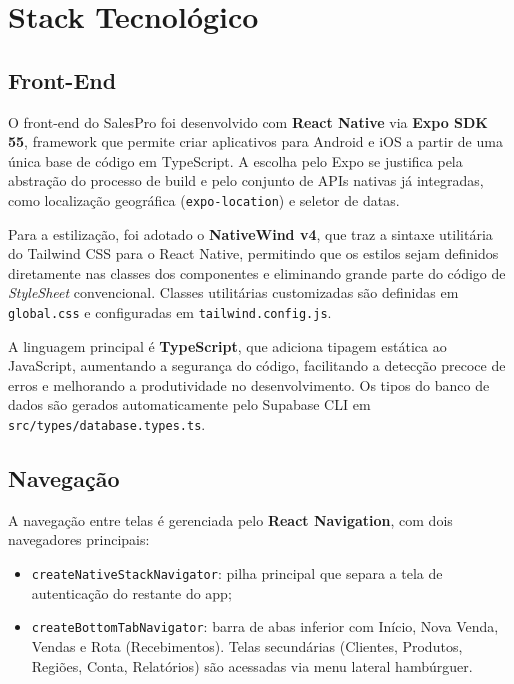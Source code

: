 \documentclass[
	12pt,				%
	oneside,			%
	a4paper,			%
	english,			%
	brazil				%
	]{abntex2}
\begin{document}
\chapter{Stack Tecnológico}

\section{Front-End}

O front-end do SalesPro foi desenvolvido com \textbf{React Native} via \textbf{Expo SDK 55}, framework que permite criar aplicativos para Android e iOS a partir de uma única base de código em TypeScript. A escolha pelo Expo se justifica pela abstração do processo de build e pelo conjunto de APIs nativas já integradas, como localização geográfica (\texttt{expo-location}) e seletor de datas.

Para a estilização, foi adotado o \textbf{NativeWind v4}, que traz a sintaxe utilitária do Tailwind CSS para o React Native, permitindo que os estilos sejam definidos diretamente nas classes dos componentes e eliminando grande parte do código de \textit{StyleSheet} convencional. Classes utilitárias customizadas são definidas em \texttt{global.css} e configuradas em \texttt{tailwind.config.js}.

A linguagem principal é \textbf{TypeScript}, que adiciona tipagem estática ao JavaScript, aumentando a segurança do código, facilitando a detecção precoce de erros e melhorando a produtividade no desenvolvimento. Os tipos do banco de dados são gerados automaticamente pelo Supabase CLI em \texttt{src/types/database.types.ts}.

\section{Navegação}

A navegação entre telas é gerenciada pelo \textbf{React Navigation}, com dois navegadores principais:

\begin{itemize}
  \item \texttt{createNativeStackNavigator}: pilha principal que separa a tela de autenticação do restante do app;
  \item \texttt{createBottomTabNavigator}: barra de abas inferior com Início, Nova Venda, Vendas e Rota (Recebimentos). Telas secundárias (Clientes, Produtos, Regiões, Conta, Relatórios) são acessadas via menu lateral hambúrguer.
\end{itemize}
\end{document}
